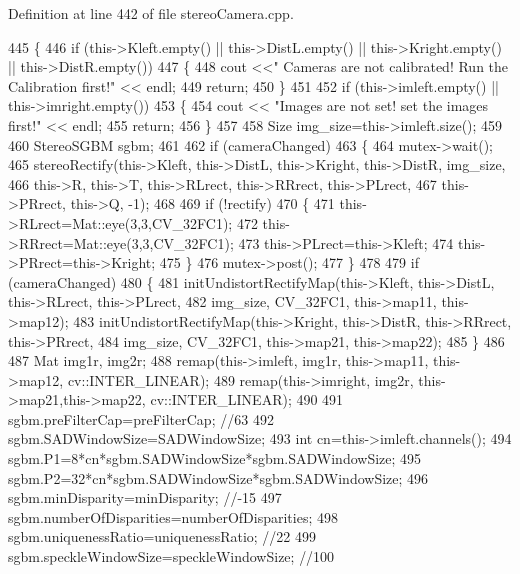 Definition at line 442 of file stereo\+Camera.\+cpp.


\begin{DoxyCode}
445 \{
446     \textcolor{keywordflow}{if} (this->Kleft.empty() || this->DistL.empty() || this->Kright.empty() || this->DistR.empty())
447     \{
448         cout <<\textcolor{stringliteral}{" Cameras are not calibrated! Run the Calibration first!"} << endl;
449         \textcolor{keywordflow}{return};
450     \}
451 
452     \textcolor{keywordflow}{if} (this->imleft.empty() || this->imright.empty())
453     \{
454         cout << \textcolor{stringliteral}{"Images are not set! set the images first!"} << endl;
455         \textcolor{keywordflow}{return};
456     \}
457 
458     Size img\_size=this->imleft.size();
459 
460     StereoSGBM sgbm;
461 
462     \textcolor{keywordflow}{if} (cameraChanged)
463     \{
464         mutex->wait();
465         stereoRectify(this->Kleft, this->DistL, this->Kright, this->DistR, img\_size,
466                       this->R, this->T, this->RLrect, this->RRrect, this->PLrect,
467                       this->PRrect, this->Q, -1);
468 
469         \textcolor{keywordflow}{if} (!rectify)
470         \{
471             this->RLrect=Mat::eye(3,3,CV\_32FC1);
472             this->RRrect=Mat::eye(3,3,CV\_32FC1);
473             this->PLrect=this->Kleft;
474             this->PRrect=this->Kright;
475         \}
476         mutex->post();
477     \}
478 
479     \textcolor{keywordflow}{if} (cameraChanged)
480     \{
481         initUndistortRectifyMap(this->Kleft, this->DistL, this->RLrect, this->PLrect,
482                                 img\_size, CV\_32FC1, this->map11, this->map12);
483         initUndistortRectifyMap(this->Kright,  this->DistR, this->RRrect, this->PRrect,
484                                 img\_size, CV\_32FC1, this->map21, this->map22);
485     \}
486     
487     Mat img1r, img2r;
488     remap(this->imleft, img1r, this->map11, this->map12, cv::INTER\_LINEAR);
489     remap(this->imright, img2r, this->map21,this->map22, cv::INTER\_LINEAR);
490   
491     sgbm.preFilterCap=preFilterCap; \textcolor{comment}{//63}
492     sgbm.SADWindowSize=SADWindowSize;
493     \textcolor{keywordtype}{int} cn=this->imleft.channels();
494     sgbm.P1=8*cn*sgbm.SADWindowSize*sgbm.SADWindowSize;
495     sgbm.P2=32*cn*sgbm.SADWindowSize*sgbm.SADWindowSize;
496     sgbm.minDisparity=minDisparity; \textcolor{comment}{//-15}
497     sgbm.numberOfDisparities=numberOfDisparities;
498     sgbm.uniquenessRatio=uniquenessRatio; \textcolor{comment}{//22}
499     sgbm.speckleWindowSize=speckleWindowSize; \textcolor{comment}{//100}

\end{DoxyCode}
